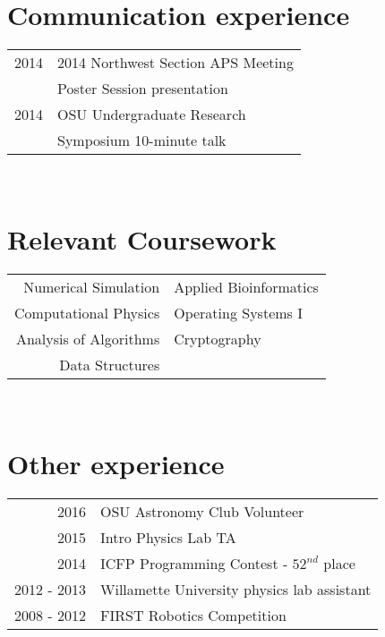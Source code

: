 \documentclass[10pt]{article} %
\begin{document}
{\begin{minipage}[t]{0.44\textwidth}

\section{Communication experience} 

\begin{tabular}{rl}
  2014 & 2014 Northwest Section APS Meeting\\
  & Poster Session presentation\\
  2014 & OSU Undergraduate Research\\
  & Symposium 10-minute talk\\
\end{tabular} \\


\section{Relevant Coursework} 

\begin{tabular}{rl}
  Numerical Simulation & Applied Bioinformatics\\
  Computational Physics & Operating Systems I\\
  Analysis of Algorithms & Cryptography\\
  Data Structures &\\
\end{tabular} \\



\section{Other experience} 

\begin{tabular}{rl}
  2016 & OSU Astronomy Club Volunteer\\
  2015 & Intro Physics Lab TA\\
  2014 & ICFP Programming Contest - $52^{nd}$ place\\
  2012 - 2013 & Willamette University physics lab assistant \\
  2008 - 2012 & FIRST Robotics Competition \\ 
\end{tabular} \\


\end{minipage}}
\end{document}

